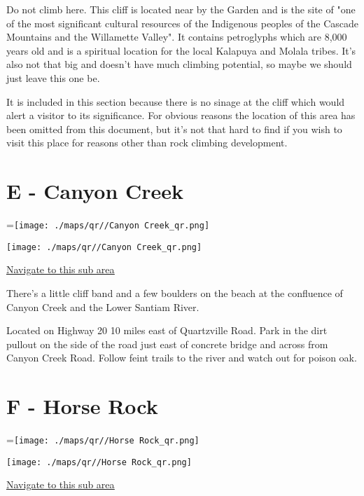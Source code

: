 \begin{multicols}{2}
Do not climb here. This cliff is located near by the Garden and is the site of "one of the most significant cultural resources of the Indigenous peoples of the Cascade Mountains and the Willamette Valley". It contains petroglyphs which are 8,000 years old and is a spiritual location for the local Kalapuya and Molala tribes. It's also not that big and doesn't have much climbing potential, so maybe we should just leave this one be. 

It is included in this section because there is no sinage at the cliff which would alert a visitor to its significance. For obvious reasons the location of this area has been omitted from this document, but it's not that hard to find if you wish to visit this place for reasons other than rock climbing development.\\




\vfill\null
\columnbreak

\section{E - Canyon Creek}\label{sa:Canyon Creek}
=\hbox{\texttt{[image: ./maps/qr//Canyon Creek\_qr.png]}}%
\begin{center}
\texttt{[image: ./maps/qr//Canyon Creek\_qr.png]}
\end{center}
\begin{center}
\underline{\textcolor{blue}{\href{http://maps.google.com/maps?q=44.39708529718213,-122.44671253776127}{Navigate to this sub area}}}
\end{center}


There's a little cliff band and a few boulders on the beach at the confluence of Canyon Creek and the Lower Santiam River.

Located on Highway 20 10 miles east of Quartzville Road. Park in the dirt pullout on the side of the road just east of concrete bridge and across from Canyon Creek Road. Follow feint trails to the river and watch out for poison oak.\\




\vfill\null
\columnbreak

\section{F - Horse Rock}\label{sa:Horse Rock}
=\hbox{\texttt{[image: ./maps/qr//Horse Rock\_qr.png]}}%
\begin{center}
\texttt{[image: ./maps/qr//Horse Rock\_qr.png]}
\end{center}
\begin{center}
\underline{\textcolor{blue}{\href{http://maps.google.com/maps?q=44.31343,-122.33943}{Navigate to this sub area}}}
\end{center}



\end{multicols}
